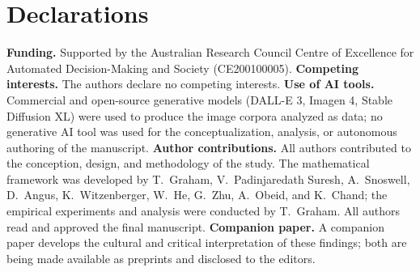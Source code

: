 \documentclass[11pt]{article}
\begin{document}
\section*{Declarations}
\textbf{Funding.} Supported by the Australian Research Council Centre of Excellence for Automated Decision-Making and Society (CE200100005). \textbf{Competing interests.} The authors declare no competing interests. \textbf{Use of AI tools.} Commercial and open-source generative models (DALL-E 3, Imagen 4, Stable Diffusion XL) were used to produce the image corpora analyzed as data; no generative AI tool was used for the conceptualization, analysis, or autonomous authoring of the manuscript. \textbf{Author contributions.} All authors contributed to the conception, design, and methodology of the study. The mathematical framework was developed by T.\ Graham, V.\ Padinjaredath Suresh, A.\ Snoswell, D.\ Angus, K.\ Witzenberger, W.\ He, G.\ Zhu, A.\ Obeid, and K.\ Chand; the empirical experiments and analysis were conducted by T.\ Graham. All authors read and approved the final manuscript. \textbf{Companion paper.} A companion paper develops the cultural and critical interpretation of these findings; both are being made available as preprints and disclosed to the editors.


\end{document}
